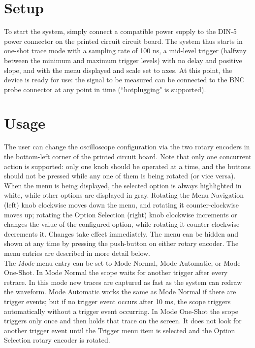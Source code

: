 \documentclass{scrartcl}
\begin{document}
	\section{Setup}
	To start the system, simply connect a compatible power supply to the DIN-5 power connector on the printed circuit circuit board. The system thus starts in one-shot trace mode with a sampling rate of 100 ns, a mid-level trigger (halfway between the minimum and maximum trigger levels) with no delay and positive slope, and with the menu displayed and scale set to axes. At this point, the device is ready for use: the signal to be measured can be connected to the BNC probe connector at any point in time (``hotplugging" is supported).
	
	\section{Usage}
	The user can change the oscilloscope configuration via the two rotary encoders in the bottom-left corner of the printed circuit board. Note that only one concurrent action is supported: only one knob should be operated at a time, and the buttons should not be pressed while any one of them is being rotated (or vice versa).\\

When the menu is being displayed, the selected option is always highlighted in white, while other options are displayed in gray. Rotating the Menu Navigation (left) knob clockwise moves down the menu, and rotating it counter-clockwise moves up; rotating the Option Selection (right) knob clockwise increments or changes the value of the configured option, while rotating it counter-clockwise decrements it. Changes take effect immediately. The menu can be hidden and shown at any time by pressing the push-button on either rotary encoder. The menu entries are described in more detail below.\\

The \textit{Mode} menu entry can be set to Mode Normal, Mode Automatic, or Mode One-Shot. In Mode Normal the scope waits for another trigger after every retrace. In this mode new traces are captured as fast as the system can redraw the waveform. Mode Automatic works the same as Mode Normal if there are trigger events; but if no trigger event occurs after 10 ms, the scope triggers automatically without a trigger event occurring. In Mode One-Shot the scope triggers only once and then holds that trace on the screen. It does not look for another trigger event until the Trigger menu item is selected and the Option Selection rotary encoder is rotated.\\
\end{document}
